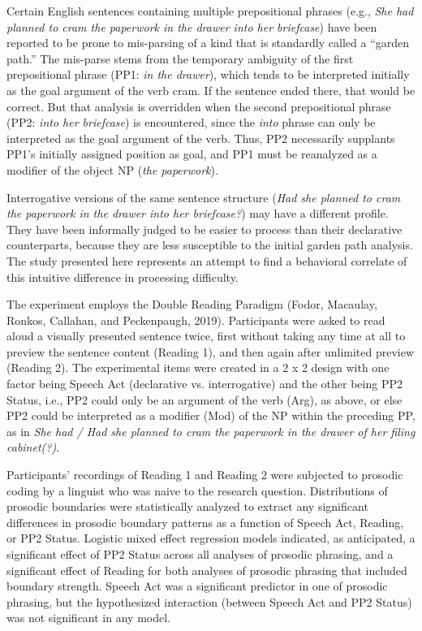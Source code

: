 \documentclass[11pt,oneside]{book}
\begin{document}
Certain English sentences containing multiple prepositional phrases (e.g., \textit{She had planned to cram the paperwork in the drawer into her briefcase}) have been reported to be prone to mis-parsing of a kind that is standardly called a “garden path.” The mis-parse stems from the temporary ambiguity of the first prepositional phrase (PP1: \textit{in the drawer}), which tends to be interpreted initially as the goal argument of the verb cram. If the sentence ended there, that would be correct. But that analysis is overridden when the second prepositional phrase (PP2: \textit{into her briefcase}) is encountered, since the \textit{into} phrase can only be interpreted as the goal argument of the verb. Thus, PP2 necessarily supplants PP1’s initially assigned position as goal, and PP1 must be reanalyzed as a modifier of the object NP (\textit{the paperwork}).  

Interrogative versions of the same sentence structure (\textit{Had she planned to cram the paperwork in the drawer into her briefcase?}) may have a different profile. They have been informally judged to be easier to process than their declarative counterparts, because they are less susceptible to the initial garden path analysis. The study presented here represents an attempt to find a behavioral correlate of this intuitive difference in processing difficulty.

The experiment employs the Double Reading Paradigm (Fodor, Macaulay, Ronkos, Callahan, and Peckenpaugh, 2019). Participants were asked to read aloud a visually presented sentence twice, first without taking any time at all to preview the sentence content (Reading 1), and then again after unlimited preview (Reading 2). The experimental items were created in a 2 x 2 design with one factor being Speech Act (declarative vs. interrogative) and the other being PP2 Status, i.e., PP2 could only be an argument of the verb (Arg), as above, or else PP2 could be interpreted as a modifier (Mod) of the NP within the preceding PP, as in \textit{She had / Had she planned to cram the paperwork in the drawer of her filing cabinet(?)}.  

Participants' recordings of Reading 1 and Reading 2 were subjected to prosodic coding by a linguist who was naive to the research question. Distributions of prosodic boundaries were statistically analyzed to extract any significant differences in prosodic boundary patterns as a function of Speech Act, Reading, or PP2 Status. Logistic mixed effect regression models indicated, as anticipated, a significant effect of PP2 Status across all analyses of prosodic phrasing, and a significant effect of Reading for both analyses of prosodic phrasing that included boundary strength. Speech Act was a significant predictor in one of prosodic phrasing, but the hypothesized interaction (between Speech Act and PP2 Status) was not significant in any model.
\end{document}
